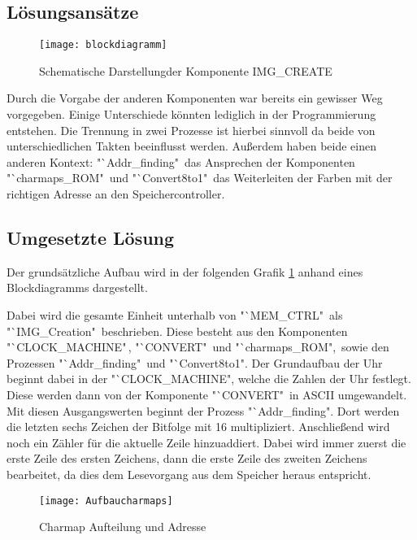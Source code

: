 \documentclass[12pt,a4paper,bibliography=totoc,listof=totoc]{scrartcl}
\begin{document}
\subsection{Lösungsansätze}
\begin{figure}[htbp]
	\centering
	\texttt{[image: blockdiagramm]}
	\caption{Schematische Darstellungder Komponente IMG\_CREATE}
	\label{blockdiagramm}
\end{figure}
Durch die Vorgabe der anderen Komponenten war bereits ein gewisser Weg vorgegeben. Einige Unterschiede könnten lediglich in der Programmierung 
entstehen. Die Trennung in zwei Prozesse ist hierbei sinnvoll da beide von unterschiedlichen Takten beeinflusst werden. Außerdem haben beide einen 
anderen Kontext: "`Addr\_finding" \,das Ansprechen der Komponenten "`charmaps\_ROM" \,und "`Convert8to1"\, das Weiterleiten der Farben mit der 
richtigen Adresse an den Speichercontroller.


\subsection{Umgesetzte Lösung}
Der grundsätzliche Aufbau wird in der folgenden Grafik \ref{blockdiagramm} anhand eines Blockdiagramms dargestellt.

Dabei wird die gesamte Einheit unterhalb von "`MEM\_CTRL" \,als "`IMG\_Creation" \,beschrieben. Diese besteht aus den Komponenten \,
"`CLOCK\_MACHINE"\,,
"`CONVERT" \,und "`charmaps\_ROM",\, sowie den Prozessen "`Addr\_finding" \,und "`Convert8to1". Der Grundaufbau der Uhr beginnt dabei in der 
"`CLOCK\_MACHINE", welche die Zahlen der Uhr festlegt. Diese werden dann von der Komponente "`CONVERT" \,in ASCII umgewandelt. Mit diesen 
Ausgangswerten beginnt der Prozess "`Addr\_finding". Dort werden die letzten sechs Zeichen der Bitfolge mit 16 multipliziert. Anschließend 
wird noch ein Zähler für die aktuelle Zeile hinzuaddiert. Dabei wird immer zuerst die erste Zeile des ersten Zeichens, dann die erste 
Zeile des zweiten Zeichens bearbeitet, da dies dem Lesevorgang aus dem Speicher heraus entspricht.

\begin{figure}[htbp]
	\centering
	\texttt{[image: Aufbaucharmaps]}
	\caption{Charmap Aufteilung und Adresse}
	\label{charmaps}
\end{figure} 
 
\end{document}

